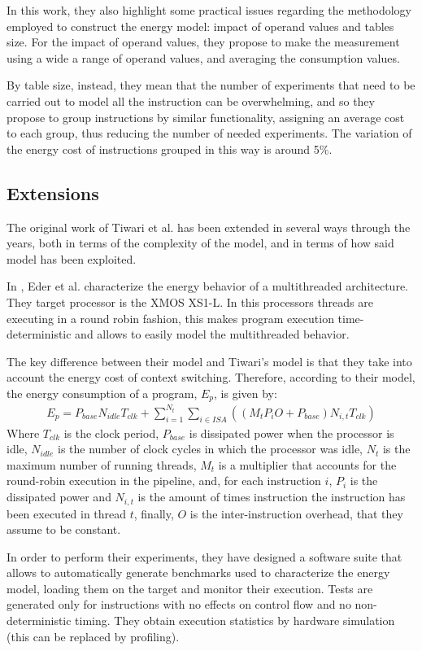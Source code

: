 In this work, they also highlight some practical issues regarding the methodology employed to construct the energy model: impact of operand values and tables size. For the impact of operand values, they propose to make the measurement using a wide a range of operand values, and averaging the consumption values. \par 
By table size, instead, they mean that the number of experiments that need to be carried out to model all the instruction can be overwhelming, and so they propose to group instructions by similar functionality, assigning an average cost to each group, thus reducing the number of needed experiments. The variation of the energy cost of instructions grouped in this way is around 5\%. 

\subsection{Extensions}
The original work of Tiwari et al. has been extended in several ways through the years, both in terms of the complexity of the model, and in terms of how said model has been exploited. \par
In \cite{xmos}, Eder et al. characterize the energy behavior of a multithreaded architecture. They target processor is the XMOS XS1-L. In this processors threads are executing in a round robin fashion, this makes program execution time-deterministic and allows to easily model the multithreaded behavior. \par 
The key difference between their model and Tiwari's model is that  they take into account the energy cost of context switching. Therefore, according to their model, the energy consumption of a program, $E_{p}$, is given by:
\begin{gather*} 
E_{p} = P_{base}N_{idle}T_{clk} + \sum_{i=1}^{N_{t}} \sum_{i \in ISA}((M_{t}P_{i}O + P_{base})N_{i,t}T_{clk})
\end{gather*}
Where $T_{clk}$ is the clock period, $P_{base}$ is dissipated power when the processor is idle, $N_{idle}$ is the number of clock cycles in which the processor was idle, $N_{t}$ is the maximum number of running threads, $M_{t}$ is a multiplier that accounts for the round-robin execution in the pipeline, and, for each instruction $i$, $P_{i}$ is the dissipated power and $N_{i,t}$ is the amount of times instruction the instruction has been executed in thread $t$, finally, $O$ is the inter-instruction overhead, that they assume to be constant. \par 
In order to perform their experiments, they have designed a software suite that allows to automatically generate benchmarks used to characterize the energy model, loading them on the target and monitor their execution. Tests are generated only for instructions with no effects on control flow and no non-deterministic timing. They obtain execution statistics by hardware simulation (this can be replaced by profiling).
